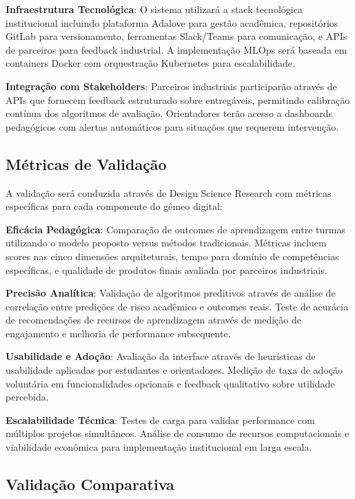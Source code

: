 \documentclass[english, spanish, brazilian]{RBIEarticle} %
\begin{document}
\textbf{Infraestrutura Tecnológica}: O sistema utilizará a stack tecnológica institucional incluindo plataforma Adalove para gestão acadêmica, repositórios GitLab para versionamento, ferramentas Slack/Teams para comunicação, e APIs de parceiros para feedback industrial. A implementação MLOps será baseada em containers Docker com orquestração Kubernetes para escalabilidade.

\textbf{Integração com Stakeholders}: Parceiros industriais participarão através de APIs que fornecem feedback estruturado sobre entregáveis, permitindo calibração contínua dos algoritmos de avaliação. Orientadores terão acesso a dashboards pedagógicos com alertas automáticos para situações que requerem intervenção.

\subsection{Métricas de Validação}

\indent

A validação será conduzida através de Design Science Research com métricas
específicas para cada componente do gêmeo digital:

\textbf{Eficácia Pedagógica}: Comparação de outcomes de aprendizagem entre turmas utilizando o modelo proposto versus métodos tradicionais. Métricas incluem scores nas cinco dimensões arquiteturais, tempo para domínio de competências específicas, e qualidade de produtos finais avaliada por parceiros industriais.

\textbf{Precisão Analítica}: Validação de algoritmos preditivos através de análise de correlação entre predições de risco acadêmico e outcomes reais. Teste de acurácia de recomendações de recursos de aprendizagem através de medição de engajamento e melhoria de performance subsequente.

\textbf{Usabilidade e Adoção}: Avaliação da interface através de heurísticas de usabilidade aplicadas por estudantes e orientadores. Medição de taxa de adoção voluntária em funcionalidades opcionais e feedback qualitativo sobre utilidade percebida.

\textbf{Escalabilidade Técnica}: Testes de carga para validar performance com múltiplos projetos simultâneos. Análise de consumo de recursos computacionais e viabilidade econômica para implementação institucional em larga escala.

\subsection{Validação Comparativa}
\end{document}
